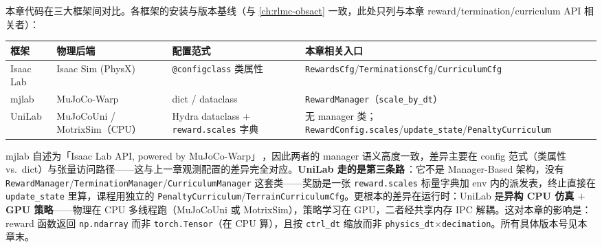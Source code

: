 \begin{note}[环境配置与三框架版本兼容]
本章代码在三大框架间对比。各框架的安装与版本基线（与 \cref{ch:rlmc-obsact} 一致，此处只列与本章 reward/termination/curriculum API 相关者）：
\begin{center}
\small
\begin{tabular}{@{}llll@{}}
\toprule
框架 & 物理后端 & 配置范式 & 本章相关入口 \\
\midrule
Isaac Lab & Isaac Sim (PhysX) & \verb|@configclass| 类属性 & \verb|RewardsCfg|/\verb|TerminationsCfg|/\verb|CurriculumCfg| \\
mjlab & MuJoCo-Warp & dict / dataclass & \verb|RewardManager|（\verb|scale_by_dt|） \\
UniLab & MuJoCoUni / MotrixSim（CPU） & Hydra dataclass + \verb|reward.scales| 字典 & 无 manager 类；\verb|RewardConfig.scales|/\verb|update_state|/\verb|PenaltyCurriculum| \\
\bottomrule
\end{tabular}
\end{center}
mjlab 自述为「Isaac Lab API, powered by MuJoCo-Warp」\,\cite{mjlab2026}，因此两者的 manager 语义高度一致，差异主要在 config 范式（类属性 vs.\ dict）与张量访问路径——这与上一章观测配置的差异完全对应。\textbf{UniLab 走的是第三条路}\,\cite{unilab2026}：它不是 Manager-Based 架构，没有 \verb|RewardManager|/\verb|TerminationManager|/\verb|CurriculumManager| 这套类——奖励是一张 \verb|reward.scales| 标量字典加 env 内的派发表，终止直接在 \verb|update_state| 里算，课程用独立的 \verb|PenaltyCurriculum|/\verb|TerrainCurriculumCfg|。更根本的差异在运行时：UniLab 是\textbf{异构 CPU 仿真 $+$ GPU 策略}——物理在 CPU 多线程跑（MuJoCoUni 或 MotrixSim），策略学习在 GPU，二者经共享内存 IPC 解耦。这对本章的影响是：reward 函数返回 \verb|np.ndarray| 而非 \verb|torch.Tensor|（在 CPU 算），且按 \verb|ctrl_dt| 缩放而非 \verb|physics_dt|$\times$\verb|decimation|。所有具体版本号见本章末。
\end{note}

